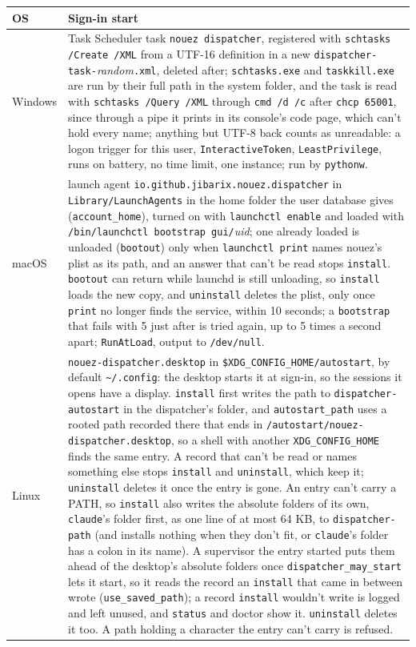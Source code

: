 \documentclass[10pt,a4paper]{article}
\newcommand{\code}[1]{\texttt{#1}}
\begin{document}
\begin{center}\small
\begin{tabularx}{\textwidth}{@{}l X@{}}
\toprule
\textbf{OS} & \textbf{Sign-in start} \\
\midrule
Windows & Task Scheduler task \code{nouez dispatcher}, registered with \code{schtasks /Create /XML}
from a UTF-16 definition in a new \code{dispatcher-task-}\textit{random}\code{.xml}, deleted after;
\code{schtasks.exe} and \code{taskkill.exe} are run by their full path in the system folder, and the task is read with \code{schtasks /Query
/XML} through \code{cmd /d /c} after \code{chcp 65001}, since through a pipe it prints in its
console's code page, which can't hold every name; anything but UTF-8 back counts as unreadable: a logon trigger for this user, \code{InteractiveToken},
\code{LeastPrivilege}, runs on battery, no time limit, one instance; run by \code{pythonw}. \\
macOS & launch agent \code{io.github.jibarix.nouez.dispatcher} in \code{Library/LaunchAgents}
in the home folder the user database gives (\code{account\_home}), turned on with \code{launchctl enable} and loaded with
\code{/bin/launchctl bootstrap gui/}\textit{uid}; one already loaded is unloaded (\code{bootout})
only when \code{launchctl print} names nouez's plist as its path, and an answer that can't be read
stops \code{install}. \code{bootout} can return while launchd is still unloading, so \code{install}
loads the new copy, and \code{uninstall} deletes the plist, only once \code{print} no longer finds
the service, within 10 seconds; a \code{bootstrap} that fails with 5 just after is tried again, up
to 5 times a second apart;
\code{RunAtLoad}, output to \code{/dev/null}. \\
Linux & \code{nouez-dispatcher.desktop} in \code{\$XDG\_CONFIG\_HOME/autostart}, by default
\code{\textasciitilde/.config}: the desktop starts it at sign-in, so the sessions it opens have a
display. \code{install} first writes the path to \code{dispatcher-autostart} in the dispatcher's
folder, and \code{autostart\_path} uses a rooted path recorded there that ends in
\code{/autostart/nouez-dispatcher.desktop}, so a shell with another \code{XDG\_CONFIG\_HOME} finds
the same entry. A record that can't be read or names something else stops \code{install} and
\code{uninstall}, which keep it; \code{uninstall} deletes it once the entry is gone. An entry
can't carry a PATH, so \code{install} also writes the absolute folders of its own, \code{claude}'s
folder first, as one line of at most 64 KB, to \code{dispatcher-path} (and installs nothing when
they don't fit, or \code{claude}'s folder has a colon in its name). A supervisor the entry started puts them ahead of the desktop's absolute folders
once \code{dispatcher\_may\_start} lets it start, so it reads the record an \code{install} that came
in between wrote (\code{use\_saved\_path}); a record \code{install} wouldn't write is logged and
left unused, and \code{status} and doctor show it. \code{uninstall} deletes it too. A path holding a character the entry can't
carry is refused. \\
\bottomrule
\end{tabularx}
\end{center}
\end{document}
